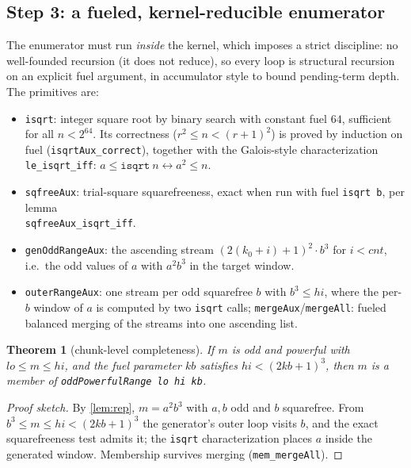 \documentclass[11pt]{article}
\newtheorem{theorem}{Theorem}[section]
\theoremstyle{definition}
\theoremstyle{remark}
\newcommand{\code}[1]{\texttt{#1}}
\begin{document}
\subsection{Step 3: a fueled, kernel-reducible enumerator}\label{sec:generator}

The enumerator must run \emph{inside} the kernel, which imposes a strict
discipline: no well-founded recursion (it does not reduce), so every loop
is structural recursion on an explicit fuel argument, in accumulator
style to bound pending-term depth. The primitives are:

\begin{itemize}[leftmargin=2em]
\item \code{isqrt}: integer square root by binary search with constant
  fuel $64$, sufficient for all $n < 2^{64}$. Its correctness
  ($r^2 \le n < (r{+}1)^2$) is proved by induction on fuel
  (\code{isqrtAux\_correct}), together with the Galois-style
  characterization \code{le\_isqrt\_iff}: $a \le \code{isqrt}\ n
  \leftrightarrow a^2 \le n$.
\item \code{sqfreeAux}: trial-square squarefreeness, exact when run with
  fuel \code{isqrt b}, per lemma\\ \code{sqfreeAux\_isqrt\_iff}.
\item \code{genOddRangeAux}: the ascending stream $(2(k_0{+}i){+}1)^2
  \cdot b^3$ for $i < \mathit{cnt}$, i.e.\ the odd values of $a$ with
  $a^2 b^3$ in the target window.
\item \code{outerRangeAux}: one stream per odd squarefree $b$ with
  $b^3 \le hi$, where the per-$b$ window of $a$ is computed by two
  \code{isqrt} calls; \code{mergeAux}/\code{mergeAll}: fueled balanced
  merging of the streams into one ascending list.
\end{itemize}

\begin{theorem}[chunk-level completeness]\label{thm:complete}
If $m$ is odd and powerful with $lo \le m \le hi$, and the fuel
parameter $kb$ satisfies $hi < (2kb{+}1)^3$, then $m$ is a member of
\code{oddPowerfulRange lo hi kb}.
\end{theorem}

\begin{proof}[Proof sketch]
By \cref{lem:rep}, $m = a^2 b^3$ with $a, b$ odd and $b$ squarefree.
From $b^3 \le m \le hi < (2kb{+}1)^3$ the generator's outer loop visits
$b$, and the exact squarefreeness test admits it; the \code{isqrt}
characterization places $a$ inside the generated window. Membership
survives merging (\code{mem\_mergeAll}).
\end{proof}
\end{document}
